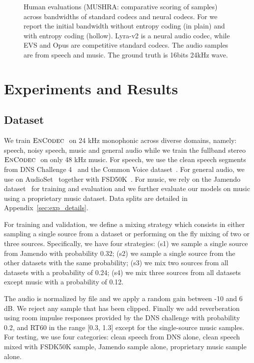 \begin{figure}[t]
     \centering
     
     \caption{Human evaluations (MUSHRA: comparative scoring of samples) across bandwidths of standard codecs
     and neural codecs. For \encodec{} we report the 
     initial bandwidth without entropy coding (in plain) and with entropy coding (hollow). Lyra-v2 is a neural audio codec, while EVS and Opus are competitive standard codecs. The audio samples are from speech and music. The ground truth is 16bits 24kHz wave.
     \label{fig:mushra_bandwidth}}
 \end{figure}

\section{Experiments and Results}

\subsection{Dataset}
\label{experiments:dataset}

We train $\textsc{EnCodec}~$ on 24 kHz monophonic across diverse domains, namely: speech, noisy speech, music and general audio while we train the fullband stereo $\textsc{EnCodec}~$ on only 48 kHz music. 
For speech, we use the clean speech segments from DNS Challenge 4~\citep{dns} and the Common Voice dataset~\citep{ardila2019common}. For general audio, we use on AudioSet~\citep{gemmeke2017audio} together with FSD50K~\citep{fonseca2021fsd50k}. 
For music, we rely on the Jamendo dataset~\citep{bogdanov2019mtg} for training and evaluation and we further evaluate our models on music using a proprietary music dataset. Data splits are detailed in Appendix~\ref{sec:exp_details}. 

For training and validation, we define a mixing strategy which consists in either sampling a single source from a dataset or performing on the fly mixing of two or three sources. Specifically, we have four strategies: (s1) we sample a single source from Jamendo with probability 0.32; (s2) we sample a single source from the other datasets with the same probability; (s3) we mix two sources from all datasets with a probability of 0.24; (s4) we mix three sources from all datasets except music with a probability of 0.12. 

The audio is normalized by file and we apply a random gain between -10 and 6 dB. We reject any sample that has been clipped. Finally we add reverberation using room impulse responses provided by the DNS challenge with probability 0.2, and RT60 in the range [0.3, 1.3] except for the single-source music samples.
For testing, we use four categories: clean speech from DNS alone, clean speech mixed with FSDK50K sample, Jamendo sample alone, proprietary music sample alone.

